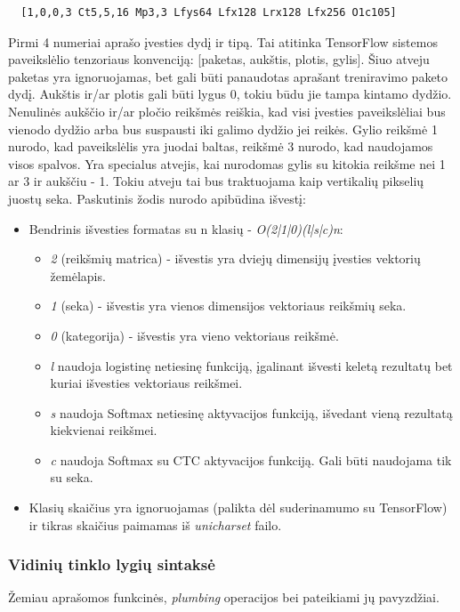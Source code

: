 \documentclass{VUMIFInfBakalaurinis}
\begin{document}
\begin{verbatim}
  [1,0,0,3 Ct5,5,16 Mp3,3 Lfys64 Lfx128 Lrx128 Lfx256 O1c105]
\end{verbatim}

Pirmi 4 numeriai aprašo įvesties dydį ir tipą. Tai atitinka TensorFlow sistemos paveikslėlio tenzoriaus konvenciją: [paketas, aukštis, plotis, gylis].
Šiuo atveju paketas yra ignoruojamas, bet gali būti panaudotas aprašant treniravimo paketo dydį.
Aukštis ir/ar plotis gali būti lygus 0, tokiu būdu jie tampa kintamo dydžio.
Nenulinės aukščio ir/ar pločio reikšmės reiškia, kad visi įvesties paveikslėliai bus vienodo dydžio arba bus suspausti iki galimo dydžio jei reikės.
Gylio reikšmė 1 nurodo, kad paveikslėlis yra juodai baltas, reikšmė 3 nurodo, kad naudojamos visos spalvos.
Yra specialus atvejis, kai nurodomas gylis su kitokia reikšme nei 1 ar 3 ir aukščiu - 1. Tokiu atveju tai bus traktuojama kaip vertikalių pikselių juostų seka.
Paskutinis žodis nurodo apibūdina išvestį:

\begin{itemize}
  \item Bendrinis išvesties formatas su n klasių - \textit{O(2|1|0)(l|s|c)n}:
  \begin{itemize}
    \item \textit{2} (reikšmių matrica) - išvestis yra dviejų dimensijų įvesties vektorių žemėlapis.
    \item \textit{1} (seka) - išvestis yra vienos dimensijos vektoriaus reikšmių seka.
    \item \textit{0} (kategorija) - išvestis yra vieno vektoriaus reikšmė.
    \item \textit{l} naudoja logistinę netiesinę funkciją, įgalinant išvesti keletą rezultatų bet kuriai išvesties vektoriaus reikšmei.
    \item \textit{s} naudoja Softmax netiesinę aktyvacijos funkciją, išvedant vieną rezultatą kiekvienai reikšmei.
    \item \textit{c} naudoja Softmax su CTC aktyvacijos funkciją. Gali būti naudojama tik su seka.
  \end{itemize}
  \item Klasių skaičius yra ignoruojamas (palikta dėl suderinamumo su TensorFlow) ir tikras skaičius paimamas iš \textit{unicharset} failo.
\end{itemize}

\subsubsection{Vidinių tinklo lygių sintaksė}
Žemiau aprašomos funkcinės, \textit{plumbing} operacijos bei pateikiami jų pavyzdžiai.
\end{document}
